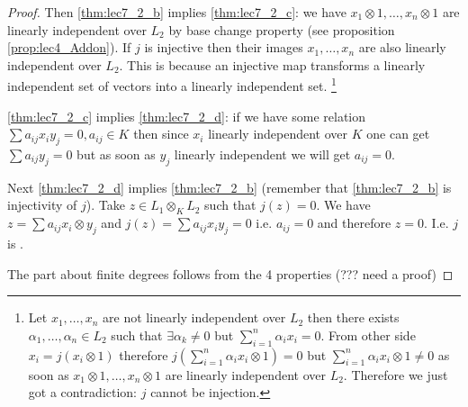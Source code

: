 \begin{theorem}
\begin{proof}
    Then \ref{thm:lec7_2_b} implies \ref{thm:lec7_2_c}: we have
    $x_1 \otimes 1, \dots, x_n \otimes 1$ are linearly independent
    over $L_2$ by base change property
    (see proposition \ref{prop:lec4_Addon}).
    If $j$ is injective then their images $x_1, \dots, x_n$
    are also linearly independent over $L_2$. This is because an
    injective map transforms a linearly independent set of vectors
    into a linearly independent set.
    \footnote{
      Let $x_1, \dots, x_n$ are not linearly independent over $L_2$
      then there exists $\alpha_1, \dots, \alpha_n \in L_2$ such that
      $\exists \alpha_k \ne 0$ but $\sum_{i=1}^n \alpha_i x_i =
      0$. From other side $x_i = j\left(x_i \otimes 1\right)$
      therefore $j\left(\sum_{i=1}^n \alpha_i x_i \otimes 1 \right) =
      0$ but $\sum_{i=1}^n \alpha_i x_i \otimes 1 \ne 0$ as soon as
      $x_1 \otimes 1, \dots, x_n \otimes 1$ are linearly independent
      over $L_2$. Therefore we just got a contradiction: $j$ cannot be
      injection. 
    }

    \ref{thm:lec7_2_c} implies \ref{thm:lec7_2_d}: if we have some
    relation $\sum a_{ij} x_i y_j = 0, a_{ij} \in K$ then since $x_i$
    linearly independent over $K$ one can get $\sum a_{ij} y_j = 0$
    but as soon as $y_j$ linearly independent we will get $a_{ij} =
    0$.

    Next \ref{thm:lec7_2_d} implies \ref{thm:lec7_2_b} (remember that
    \ref{thm:lec7_2_b} is injectivity of $j$). Take
    $z \in L_1 \otimes_K L_2$ such that $j\left(z\right) = 0$. We have
    $z = \sum a_{ij} x_i \otimes y_j$ and
    $j\left(z\right) = \sum a_{ij} x_i y_j = 0$ i.e. $a_{ij} = 0$ and
    therefore $z = 0$. I.e. $j$ is .

    The part about finite degrees follows from the 4 properties (???
    need a proof)
  \end{proof}
  \label{thm:lec7_2}
\end{theorem}

